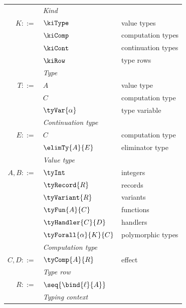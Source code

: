 \begin{figure}
   {\small
   \begin{minipage}[t]{0.46\textwidth}
   \begin{tabularx}{\textwidth}{rL{2.6cm}L{3cm}}
      &\textit{Kind}&
      \\
      $K ::=$
      &
      $\kiType$
      &
      value types
      \\
      &
      $\kiComp$
      &
      computation types
      \\
      &
      $\kiCont$
      &
      continuation types
      \\
      &
      $\kiRow$
      &
      type rows
      \\[2mm]
      &\textit{Type}&
      \\
      $T ::=$
      &
      $A$
      &
      value type
      \\
      &
      $C$
      &
      computation type
      \\
      &
      $\tyVar{\alpha}$
      &
      type variable
      \\[2mm]
      &\textit{Continuation type}&
      \\
      $E ::=$
      &
      $C$
      &
      computation type
      \\
      &
      $\elimTy{A}{E}$
      &
      eliminator type
      \\[2mm]
      &\textit{Value type}&
      \\
      $A, B ::=$
      &
      $\tyInt$
      &
      integers
      \\
      &
      $\tyRecord{R}$
      &
      records
      \\
      &
      $\tyVariant{R}$
      &
      variants
      \\
      &
      $\tyFun{A}{C}$
      &
      functions
      \\
      &
      $\tyHandler{C}{D}$
      &
      handlers
      \\
      &
      $\tyForall{\alpha}{K}{C}$
      &
      polymorphic types
      \\[2mm]
      &\textit{Computation type}&
      \\
      $C, D ::=$
      &
      $\tyComp{A}{R}$
      &
      effect
      \\[2mm]
      &\textit{Type row}&
      \\
      $R ::=$
      &
      $\seq{\bind{\ell}{A}}$
      &
      \\[2mm]
      &\textit{Typing context}&
      \\

\end{tabularx}
\end{minipage}}
\end{figure}

